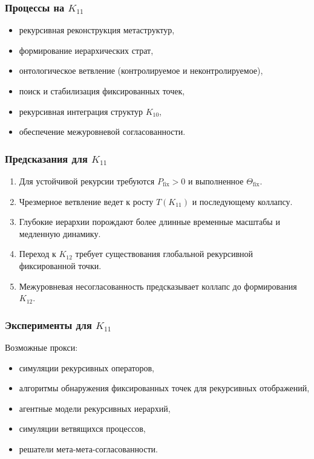 \subsubsection{Процессы на $K_{11}$}

\begin{itemize}
    \item рекурсивная реконструкция метаструктур,
    \item формирование иерархических страт,
    \item онтологическое ветвление (контролируемое и неконтролируемое),
    \item поиск и стабилизация фиксированных точек,
    \item рекурсивная интеграция структур $K_{10}$,
    \item обеспечение межуровневой согласованности.
\end{itemize}

\subsubsection{Предсказания для $K_{11}$}

\begin{enumerate}
    \item Для устойчивой рекурсии требуются $P_{\mathrm{fix}}>0$ и выполненное $\Theta_{\mathrm{fix}}$.
    \item Чрезмерное ветвление ведет к росту $T(K_{11})$ и последующему коллапсу.
    \item Глубокие иерархии порождают более длинные временные масштабы и медленную динамику.
    \item Переход к $K_{12}$ требует существования глобальной рекурсивной фиксированной точки.
    \item Межуровневая несогласованность предсказывает коллапс до формирования $K_{12}$.
\end{enumerate}

\subsubsection{Эксперименты для $K_{11}$}

Возможные прокси:
\begin{itemize}
    \item симуляции рекурсивных операторов,
    \item алгоритмы обнаружения фиксированных точек для рекурсивных отображений,
    \item агентные модели рекурсивных иерархий,
    \item симуляции ветвящихся процессов,
    \item решатели мета-мета-согласованности.
\end{itemize}

